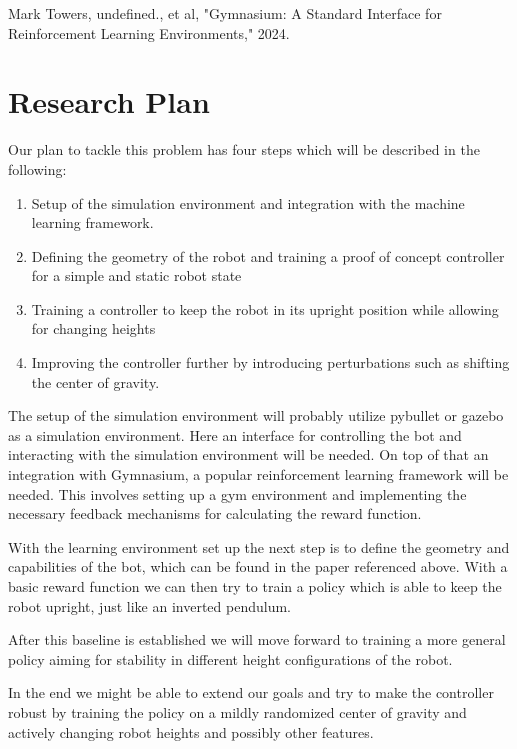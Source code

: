\documentclass[a4paper]{article}
\begin{document}
Mark Towers, undefined., et al, "Gymnasium: A Standard Interface for Reinforcement Learning Environments," 2024.

\section{Research Plan}
Our plan to tackle this problem has four steps which will be described in the following:
\begin{enumerate}
  \item Setup of the simulation environment and integration with the machine learning framework.
  \item Defining the geometry of the robot and training a proof of concept controller for a simple
        and static robot state
  \item Training a controller to keep the robot in its upright position while allowing for changing heights
  \item Improving the controller further by introducing perturbations such as shifting the center of
        gravity.
\end{enumerate}

The setup of the simulation environment will probably utilize pybullet or gazebo as a simulation
environment. Here an interface for controlling the bot and interacting with the simulation environment
will be needed. On top of that an integration with Gymnasium, a popular reinforcement learning
framework will be needed. This involves setting up a gym environment and implementing the necessary
feedback mechanisms for calculating the reward function.

With the learning environment set up the next step is to define the geometry and capabilities of the
bot, which can be found in the paper referenced above. With a basic reward function we can then try
to train a policy which is able to keep the robot upright, just like an inverted pendulum.

After this baseline is established we will move forward to training a more general policy aiming for
stability in different height configurations of the robot.

In the end we might be able to extend our goals and try to make the controller robust by training
the policy on a mildly randomized center of gravity and actively changing robot heights and possibly
other features.
\end{document}
